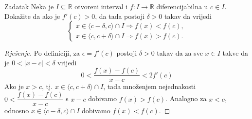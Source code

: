 \begin{exercise}{Zadatak} 
\label{localder}
Neka je \(I\subseteq \mathbb{R}\) otvoreni interval i \(f : I \to \mathbb{R}\) diferencijabilna u \(c\in I\). Dokažite da ako je \(f'(c)>0\), da tada postoji \(\delta>0\) takav da vrijedi
\[
\begin{cases}
x\in \langle c-\delta, c\rangle\cap I\Rightarrow f(x)<f(c),\\
x\in \langle c, c+\delta\rangle\cap I\Rightarrow f(x)>f(c).
\end{cases}
\]
\end{exercise}
\begin{proof}[Rješenje]
Po definiciji, za \(\epsilon=f'(c)\) postoji \(\delta>0\) takav da za sve \(x\in I\) takve da je \(0<|x-c|<\delta\) vrijedi
\[0<\dfrac{f(x)-f(c)}{x-c}<2f'(c)\]
Ako je \(x>c\), tj. \(x\in \langle c,c+\delta\rangle\cap I\), tada množenjem nejednakosti \(0<\dfrac{f(x)-f(c)}{x-c}\) s \(x-c\) dobivamo \(f(x)>f(c)\). Analogno za \(x<c\), odnosno \(x\in \langle c-\delta, c\rangle\cap I\) dobivamo \(f(x)<f(c)\).
\end{proof}

